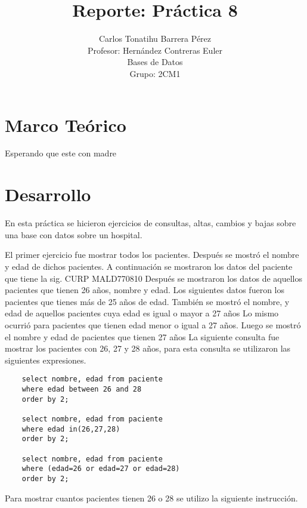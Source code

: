 \documentclass[12pt, titlepage]{article}
\title{Reporte: Práctica 8}
\author{Carlos Tonatihu Barrera Pérez \\ Profesor: Hernández Contreras Euler \\ Bases de Datos \\ Grupo: 2CM1 }
\begin{document}
	\maketitle
	\tableofcontents
	\section{Marco Teórico}
	Esperando que este con madre
	\section{Desarrollo}
	En esta práctica se hicieron ejercicios de consultas, altas, cambios y bajas sobre una base con datos sobre un hospital.
	
	El primer ejercicio fue mostrar todos los pacientes.
	Después se mostró el nombre y edad de dichos pacientes.
	A continuación se mostraron los datos del paciente que tiene la sig. CURP MALD770810
	Después se mostraron los datos de aquellos pacientes que tienen 26 años, nombre y edad.
	Los siguientes datos fueron los pacientes que tienes más de 25 años de edad.
	También se mostró el nombre, y edad de aquellos pacientes cuya edad es igual o mayor a 27 años
	Lo mismo ocurrió para pacientes que tienen edad menor o igual a 27 años.
	Luego se mostró el nombre y edad de pacientes que tienen 27 años
	La siguiente consulta fue mostrar los pacientes con 26, 27 y 28 años, para esta consulta se utilizaron las siguientes expresiones.
	\begin{lstlisting}
	select nombre, edad from paciente
	where edad between 26 and 28
	order by 2;
	
	select nombre, edad from paciente
	where edad in(26,27,28)
	order by 2;
	
	select nombre, edad from paciente
	where (edad=26 or edad=27 or edad=28)
	order by 2;
	\end{lstlisting}
	
	Para mostrar cuantos pacientes tienen 26 o 28 se utilizo la siguiente instrucción.
	
\end{document}
